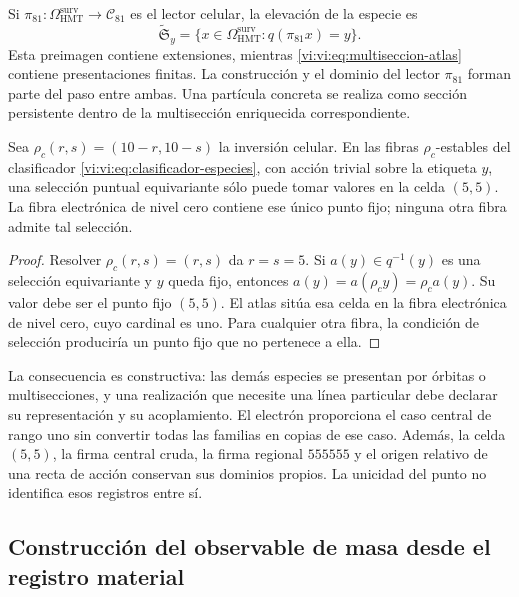 Si $\pi_{81}:\Omega^{\mathrm{surv}}_{\mathrm{HMT}}\to
\mathcal C_{81}$ es el lector celular, la elevación de la especie es
\begin{equation}
 \widetilde{\mathfrak S}_y
 =\{x\in\Omega^{\mathrm{surv}}_{\mathrm{HMT}}:
                  q(\pi_{81}x)=y\}.
 \label{vi:vi:eq:multiseccion-enriquecida}
\end{equation}
Esta preimagen contiene extensiones, mientras
\eqref{vi:vi:eq:multiseccion-atlas} contiene presentaciones finitas. La
construcción y el dominio del lector $\pi_{81}$ forman parte del paso
entre ambas. Una partícula concreta se realiza como sección persistente
dentro de la multisección enriquecida correspondiente.

\begin{theorem}
\label{vi:vi:thm:selector-central}
Sea $\rho_c(r,s)=(10-r,10-s)$ la inversión celular. En las fibras
$\rho_c$-estables del clasificador \eqref{vi:vi:eq:clasificador-especies},
con acción trivial sobre la etiqueta $y$, una selección puntual
equivariante sólo puede tomar valores en la celda $(5,5)$. La fibra
electrónica de nivel cero contiene ese único punto fijo; ninguna otra
fibra admite tal selección.
\end{theorem}
\begin{proof}
Resolver $\rho_c(r,s)=(r,s)$ da $r=s=5$. Si $a(y)\in q^{-1}(y)$
es una selección equivariante y $y$ queda fijo, entonces
$a(y)=a(\rho_c y)=\rho_c a(y)$. Su valor debe ser el punto fijo
$(5,5)$. El atlas sitúa esa celda en la fibra electrónica de nivel
cero, cuyo cardinal es uno. Para cualquier otra fibra, la condición
de selección produciría un punto fijo que no pertenece a ella.
\end{proof}

La consecuencia es constructiva: las demás especies se presentan por
órbitas o multisecciones, y una realización que necesite una línea
particular debe declarar su representación y su acoplamiento. El
electrón proporciona el caso central de rango uno sin convertir todas
las familias en copias de ese caso. Además, la celda $(5,5)$, la firma
central cruda, la firma regional $555555$ y el origen relativo de una
recta de acción conservan sus dominios propios. La unicidad del punto
no identifica esos registros entre sí.

\subsection{Construcción del observable de masa desde el registro material}
\label{vi:vi:subsec:particula-observable}

